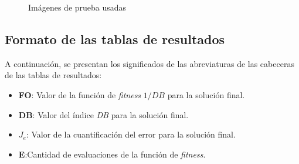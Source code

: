 \begin{figure}[h!]
  \centering
   \qquad
  \caption{Imágenes de prueba usadas}
  \label{fig:imgs}
\end{figure}

\subsection{Formato de las tablas de resultados}

    A continuación, se presentan los significados de las abreviaturas de las
cabeceras de las tablas de resultados:
\begin{itemize}
    \item \textbf{FO}: Valor de la función de \emph{fitness} $1/DB$ para la
solución final.
    \item \textbf{DB}: Valor del índice \emph{DB} para la solución final.
    \item \textbf{$J_e$}: Valor de la cuantificación del error para la solución
final.
	\item \textbf{E}:Cantidad de evaluaciones de la función de \emph{fitness}.
\end{itemize}

